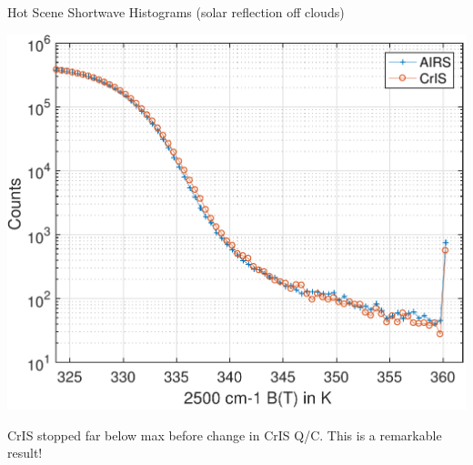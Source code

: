 \documentclass[10pt,t]{beamer}
\begin{document}
\begin{frame}[label={sec:org86b7c90}]{Hot Scene Shortwave Histograms (solar reflection off clouds)}
\begin{center}
\includegraphics[width=0.7\linewidth]{./Figs/Pdf/global_sw_counts_bt325plus.pdf}
\end{center}
\vspace{-0.05in}
\small
CrIS stopped far below max before change in CrIS Q/C.  This is a remarkable
result!
\end{frame}
\end{document}

